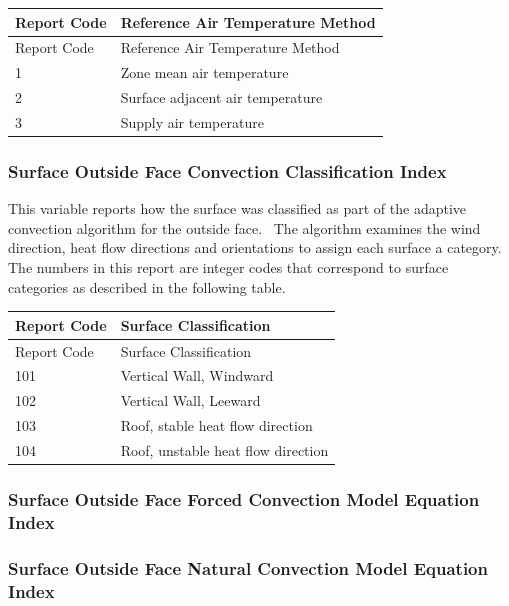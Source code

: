 \begin{longtable}[c]{@{}ll@{}}
\toprule
Report Code & Reference Air Temperature Method \tabularnewline
\midrule
\endfirsthead

\toprule
Report Code & Reference Air Temperature Method \tabularnewline
\midrule
\endhead

1 & Zone mean air temperature \tabularnewline
2 & Surface adjacent air temperature \tabularnewline
3 & Supply air temperature \tabularnewline
\bottomrule
\end{longtable}

\subsubsection{Surface Outside Face Convection Classification Index}\label{surface-outside-face-convection-classification-index}

This variable reports how the surface was classified as part of the adaptive convection algorithm for the outside face.~ The algorithm examines the wind direction, heat flow directions and orientations to assign each surface a category.~ The numbers in this report are integer codes that correspond to surface categories as described in the following table.

\begin{longtable}[c]{@{}ll@{}}
\toprule
Report Code & Surface Classification \tabularnewline
\midrule
\endfirsthead

\toprule
Report Code & Surface Classification \tabularnewline
\midrule
\endhead

101 & Vertical Wall, Windward \tabularnewline
102 & Vertical Wall, Leeward \tabularnewline
103 & Roof, stable heat flow direction \tabularnewline
104 & Roof, unstable heat flow direction \tabularnewline
\bottomrule
\end{longtable}

\subsubsection{Surface Outside Face Forced Convection Model Equation Index}\label{surface-outside-face-forced-convection-model-equation-index}

\subsubsection{Surface Outside Face Natural Convection Model Equation Index}\label{surface-outside-face-natural-convection-model-equation-index}

